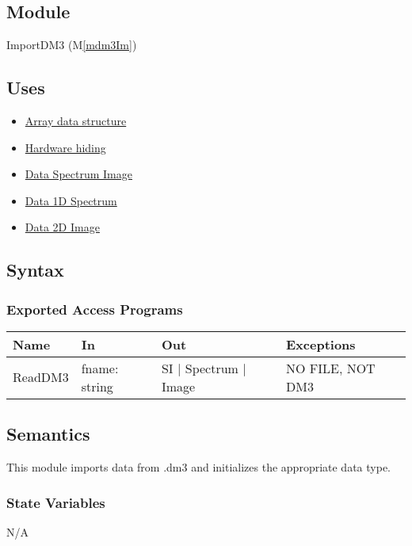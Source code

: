\documentclass[12pt, titlepage]{article}
\newcommand{\mref}[1]{M\ref{#1}}
\begin{document}
\subsection{Module}

ImportDM3 (\mref{mdm3Im})

\subsection{Uses}
\begin{itemize}
    \item \hyperref[Mod:Array]{Array data structure}
    \item \hyperref[Mod:HH]{Hardware hiding}
    \item \hyperref[Mod:SI]{Data Spectrum Image}
    \item \hyperref[Mod:Spectrum]{Data 1D Spectrum}
    \item \hyperref[Mod:Image]{Data 2D Image}
\end{itemize}

\subsection{Syntax}

\subsubsection{Exported Access Programs}

\begin{center}
    \begin{tabular}{p{2cm} p{4cm} p{4cm} p{4cm}}
        \hline
        \textbf{Name} & \textbf{In} & \textbf{Out} & \textbf{Exceptions} \\
        \hline
        ReadDM3 & fname: string & SI $|$ Spectrum $|$ Image & NO FILE, NOT DM3 \\
        \hline
    \end{tabular}
\end{center}

\subsection{Semantics}
This module imports data from .dm3 and initializes the appropriate data type.

\subsubsection{State Variables}
N/A
\end{document}
